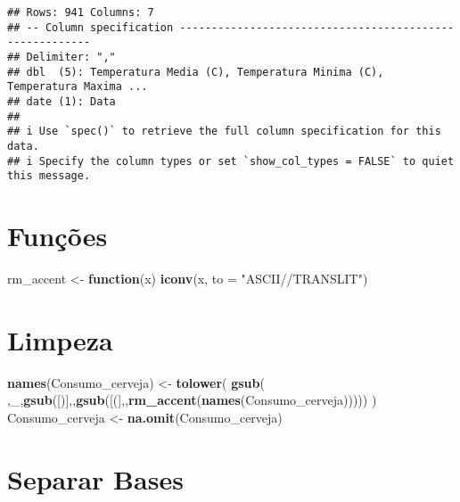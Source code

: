 \documentclass[
]{article}
\newenvironment{Shaded}{\begin{snugshade}}{\end{snugshade}}
\newcommand{\AttributeTok}[1]{\textcolor[rgb]{0.13,0.29,0.53}{#1}}
\newcommand{\ControlFlowTok}[1]{\textcolor[rgb]{0.13,0.29,0.53}{\textbf{#1}}}
\newcommand{\FunctionTok}[1]{\textcolor[rgb]{0.13,0.29,0.53}{\textbf{#1}}}
\newcommand{\NormalTok}[1]{#1}
\newcommand{\OtherTok}[1]{\textcolor[rgb]{0.56,0.35,0.01}{#1}}
\newcommand{\StringTok}[1]{\textcolor[rgb]{0.31,0.60,0.02}{#1}}
\begin{document}
\begin{verbatim}
## Rows: 941 Columns: 7
## -- Column specification --------------------------------------------------------
## Delimiter: ","
## dbl  (5): Temperatura Media (C), Temperatura Minima (C), Temperatura Maxima ...
## date (1): Data
## 
## i Use `spec()` to retrieve the full column specification for this data.
## i Specify the column types or set `show_col_types = FALSE` to quiet this message.
\end{verbatim}

\hypertarget{funuxe7uxf5es}{%
\section{Funções}\label{funuxe7uxf5es}}

\begin{Shaded}
\begin{Highlighting}[]
\NormalTok{rm\_accent }\OtherTok{\textless{}{-}} \ControlFlowTok{function}\NormalTok{(x) }\FunctionTok{iconv}\NormalTok{(x, }\AttributeTok{to =} \StringTok{"ASCII//TRANSLIT"}\NormalTok{)}
\end{Highlighting}
\end{Shaded}

\hypertarget{limpeza}{%
\section{Limpeza}\label{limpeza}}

\begin{Shaded}
\begin{Highlighting}[]
\FunctionTok{names}\NormalTok{(Consumo\_cerveja) }\OtherTok{\textless{}{-}} \FunctionTok{tolower}\NormalTok{(}
  \FunctionTok{gsub}\NormalTok{(}\StringTok{\textquotesingle{} \textquotesingle{}}\NormalTok{,}\StringTok{\textquotesingle{}\_\textquotesingle{}}\NormalTok{,}\FunctionTok{gsub}\NormalTok{(}\StringTok{\textquotesingle{}[)]\textquotesingle{}}\NormalTok{,}\StringTok{\textquotesingle{}\textquotesingle{}}\NormalTok{,}\FunctionTok{gsub}\NormalTok{(}\StringTok{\textquotesingle{}[(]\textquotesingle{}}\NormalTok{,}\StringTok{\textquotesingle{}\textquotesingle{}}\NormalTok{,}\FunctionTok{rm\_accent}\NormalTok{(}\FunctionTok{names}\NormalTok{(Consumo\_cerveja)))))}
\NormalTok{  )}
\NormalTok{Consumo\_cerveja }\OtherTok{\textless{}{-}} \FunctionTok{na.omit}\NormalTok{(Consumo\_cerveja)}
\end{Highlighting}
\end{Shaded}

\hypertarget{separar-bases}{%
\section{Separar Bases}\label{separar-bases}}
\end{document}
